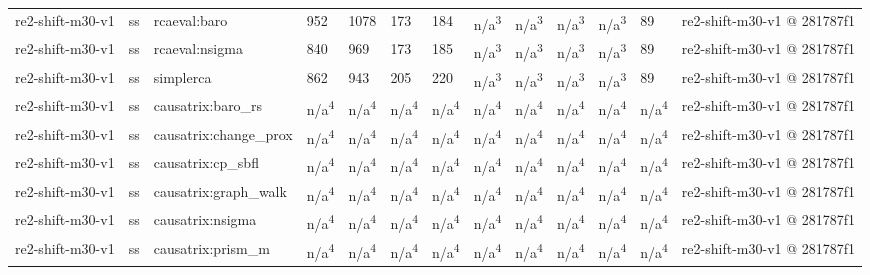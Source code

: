 \begin{table}[t]
\begin{tabular}{lllllllllllll}
re2-shift-m30-v1 & ss & rcaeval:baro & 952 & 1078 & 173 & 184 & n/a\textsuperscript{3} & n/a\textsuperscript{3} & n/a\textsuperscript{3} & n/a\textsuperscript{3} & 89 & re2-shift-m30-v1 @ 281787f1 \\
re2-shift-m30-v1 & ss & rcaeval:nsigma & 840 & 969 & 173 & 185 & n/a\textsuperscript{3} & n/a\textsuperscript{3} & n/a\textsuperscript{3} & n/a\textsuperscript{3} & 89 & re2-shift-m30-v1 @ 281787f1 \\
re2-shift-m30-v1 & ss & simplerca & 862 & 943 & 205 & 220 & n/a\textsuperscript{3} & n/a\textsuperscript{3} & n/a\textsuperscript{3} & n/a\textsuperscript{3} & 89 & re2-shift-m30-v1 @ 281787f1 \\
re2-shift-m30-v1 & ss & causatrix:baro\_rs & n/a\textsuperscript{4} & n/a\textsuperscript{4} & n/a\textsuperscript{4} & n/a\textsuperscript{4} & n/a\textsuperscript{4} & n/a\textsuperscript{4} & n/a\textsuperscript{4} & n/a\textsuperscript{4} & n/a\textsuperscript{4} & re2-shift-m30-v1 @ 281787f1 \\
re2-shift-m30-v1 & ss & causatrix:change\_prox & n/a\textsuperscript{4} & n/a\textsuperscript{4} & n/a\textsuperscript{4} & n/a\textsuperscript{4} & n/a\textsuperscript{4} & n/a\textsuperscript{4} & n/a\textsuperscript{4} & n/a\textsuperscript{4} & n/a\textsuperscript{4} & re2-shift-m30-v1 @ 281787f1 \\
re2-shift-m30-v1 & ss & causatrix:cp\_sbfl & n/a\textsuperscript{4} & n/a\textsuperscript{4} & n/a\textsuperscript{4} & n/a\textsuperscript{4} & n/a\textsuperscript{4} & n/a\textsuperscript{4} & n/a\textsuperscript{4} & n/a\textsuperscript{4} & n/a\textsuperscript{4} & re2-shift-m30-v1 @ 281787f1 \\
re2-shift-m30-v1 & ss & causatrix:graph\_walk & n/a\textsuperscript{4} & n/a\textsuperscript{4} & n/a\textsuperscript{4} & n/a\textsuperscript{4} & n/a\textsuperscript{4} & n/a\textsuperscript{4} & n/a\textsuperscript{4} & n/a\textsuperscript{4} & n/a\textsuperscript{4} & re2-shift-m30-v1 @ 281787f1 \\
re2-shift-m30-v1 & ss & causatrix:nsigma & n/a\textsuperscript{4} & n/a\textsuperscript{4} & n/a\textsuperscript{4} & n/a\textsuperscript{4} & n/a\textsuperscript{4} & n/a\textsuperscript{4} & n/a\textsuperscript{4} & n/a\textsuperscript{4} & n/a\textsuperscript{4} & re2-shift-m30-v1 @ 281787f1 \\
re2-shift-m30-v1 & ss & causatrix:prism\_m & n/a\textsuperscript{4} & n/a\textsuperscript{4} & n/a\textsuperscript{4} & n/a\textsuperscript{4} & n/a\textsuperscript{4} & n/a\textsuperscript{4} & n/a\textsuperscript{4} & n/a\textsuperscript{4} & n/a\textsuperscript{4} & re2-shift-m30-v1 @ 281787f1 \\

\end{tabular}
\end{table}

